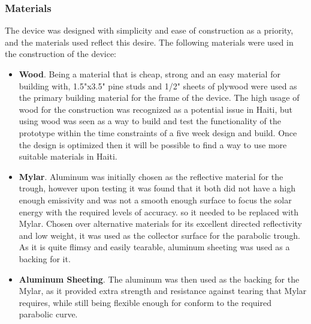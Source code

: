 \documentclass[11pt,english]{article}
\begin{document}
\subsubsection*{Materials}
The device was designed with simplicity and ease of construction as a priority, and the materials used reflect this desire.
The following materials were used in the construction of the device:
\begin{itemize}
\item \textbf{Wood}. Being a material that is cheap, strong and an easy material for building with, 1.5"x3.5" pine studs and 1/2" sheets of plywood were used as the primary building material for the frame of the device. The high usage of wood for the construction was recognized as a potential issue in Haiti, but using wood was seen as a way to build and test the functionality of the prototype within the time constraints of a five week design and build. Once the design is optimized then it will be possible to find a way to use more suitable materials in Haiti. 
\item \textbf{Mylar\textsuperscript{\textregistered}}. Aluminum was initially chosen as the reflective material for the trough, however upon testing it was found that it both did not have a high enough emissivity and was not a smooth enough surface to focus the solar energy with the required levels of accuracy. so it needed to be replaced with Mylar\textsuperscript{\textregistered}. Chosen over alternative materials for its excellent directed reflectivity and low weight, it was used as the collector surface for the parabolic trough. As it is quite flimsy and easily tearable, aluminum sheeting was used as a backing for it. 
\item \textbf{Aluminum Sheeting}. The aluminum was then used as the backing for the Mylar\textsuperscript{\textregistered}, as it provided extra strength and resistance against tearing that Mylar\textsuperscript{\textregistered} requires, while still being flexible enough for conform to the required parabolic curve. 


\end{itemize}
\end{document}
